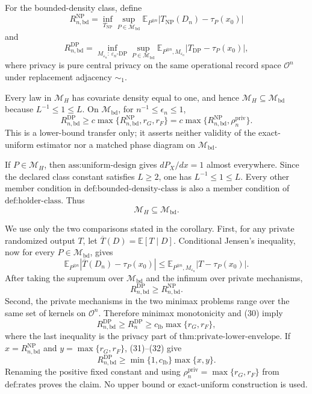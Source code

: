 For the bounded-density class, define
\[
 R_{n,\mathrm{bd}}^{\mathrm{NP}}
 =\inf_{T_{\mathrm{NP}}}\sup_{P\in\mathcal M_{\mathrm{bd}}}
   \mathbb E_{P^{\otimes n}}\left|T_{\mathrm{NP}}(D_n)-\tau_P(x_0)\right|
\]
and
\[
 R_{n,\mathrm{bd}}^{\mathrm{DP}}
 =\inf_{M_{\varepsilon_n}:\,\varepsilon_n\text{-DP}}
   \sup_{P\in\mathcal M_{\mathrm{bd}}}
   \mathbb E_{P^{\otimes n},M_{\varepsilon_n}}
   \left|T_{\mathrm{DP}}-\tau_P(x_0)\right|,
\]
where privacy is pure central privacy on the same operational record space \(\mathcal O^n\) under replacement adjacency \(\sim_1\).

Every law in \(\mathcal M_H\) has covariate density equal to one, and hence \(\mathcal M_H\subseteq\mathcal M_{\mathrm{bd}}\) because \(L^{-1}\le1\le L\).  On \(\mathcal M_{\mathrm{bd}}\), for \(n^{-1}\le\epsilon_n\le1\),
\[
 R_{n,\mathrm{bd}}^{\mathrm{DP}}
 \ge c\max\{R_{n,\mathrm{bd}}^{\mathrm{NP}},r_G,r_F\}
 =c\max\{R_{n,\mathrm{bd}}^{\mathrm{NP}},\rho_n^{\mathrm{priv}}\}.
\]
This is a lower-bound transfer only; it asserts neither validity of the exact-uniform estimator nor a matched phase diagram on \(\mathcal M_{\mathrm{bd}}\).

If \(P\in\mathcal M_H\), then \(\text{ass:uniform-design}\) gives \(dP_X/dx=1\) almost everywhere.  Since the declared class constant satisfies \(L\ge2\), one has \(L^{-1}\le1\le L\).  Every other member condition in \(\text{def:bounded-density-class}\) is also a member condition of \(\text{def:holder-class}\).  Thus
\[
 \mathcal M_H\subseteq\mathcal M_{\mathrm{bd}}.                                \tag{30}
\]

We use only the two comparisons stated in the corollary.  First, for any private randomized output \(T\), let \(\overline T(D)=\mathbb E[T\mid D]\).  Conditional Jensen's inequality, now for every \(P\in\mathcal M_{\mathrm{bd}}\), gives
\[
 \mathbb E_{P^{\otimes n}}\left|\overline T(D_n)-\tau_P(x_0)\right|
 \le
 \mathbb E_{P^{\otimes n},M_{\varepsilon_n}}
 \left|T-\tau_P(x_0)\right|.
\]
After taking the supremum over \(\mathcal M_{\mathrm{bd}}\) and the infimum over private mechanisms,
\[
 R_{n,\mathrm{bd}}^{\mathrm{DP}}
 \ge R_{n,\mathrm{bd}}^{\mathrm{NP}}.                                           \tag{31}
\]
Second, the private mechanisms in the two minimax problems range over the same set of kernels on \(\mathcal O^n\).  Therefore minimax monotonicity and (30) imply
\[
 R_{n,\mathrm{bd}}^{\mathrm{DP}}
 \ge R_n^{\mathrm{DP}}
 \ge c_{\mathrm{lb}}\max\{r_G,r_F\},                                           \tag{32}
\]
where the last inequality is the privacy part of \(\text{thm:private-lower-envelope}\).  If \(x=R_{n,\mathrm{bd}}^{\mathrm{NP}}\) and \(y=\max\{r_G,r_F\}\), (31)--(32) give
\[
 R_{n,\mathrm{bd}}^{\mathrm{DP}}
 \ge \min\{1,c_{\mathrm{lb}}\}\max\{x,y\}.
\]
Renaming the positive fixed constant and using \(\rho_n^{\mathrm{priv}}=\max\{r_G,r_F\}\) from \(\text{def:rates}\) proves the claim.  No upper bound or exact-uniform construction is used.
